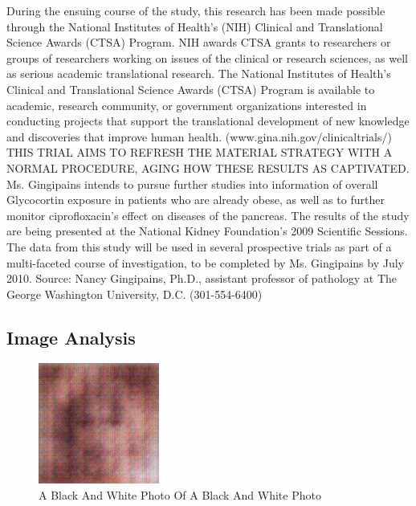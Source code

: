 \documentclass{article}%
\begin{document}
During the ensuing course of the study, this research has been made possible through the National Institutes of Health's (NIH) Clinical and Translational Science Awards (CTSA) Program. NIH awards CTSA grants to researchers or groups of researchers working on issues of the clinical or research sciences, as well as serious academic translational research.\newline%
The National Institutes of Health's Clinical and Translational Science Awards (CTSA) Program is available to academic, research community, or government organizations interested in conducting projects that support the translational development of new knowledge and discoveries that improve human health. (www.gina.nih.gov/clinicaltrials/)\newline%
THIS TRIAL AIMS TO REFRESH THE MATERIAL STRATEGY WITH A NORMAL PROCEDURE, AGING HOW THESE RESULTS AS CAPTIVATED.\newline%
Ms. Gingipains intends to pursue further studies into information of overall Glycocortin exposure in patients who are already obese, as well as to further monitor ciprofloxacin's effect on diseases of the pancreas.\newline%
The results of the study are being presented at the National Kidney Foundation's 2009 Scientific Sessions. The data from this study will be used in several prospective trials as part of a multi{-}faceted course of investigation, to be completed by Ms. Gingipains by July 2010.\newline%
Source: Nancy Gingipains, Ph.D., assistant professor of pathology at The George Washington University, D.C. (301{-}554{-}6400)

%
\subsection{Image Analysis}%
\label{subsec:ImageAnalysis}%


\begin{figure}[h!]%
\centering%
\includegraphics[width=150px]{500_fake_images/samples_5_151.png}%
\caption{A Black And White Photo Of A Black And White Photo}%
\end{figure}

%
\end{document}

